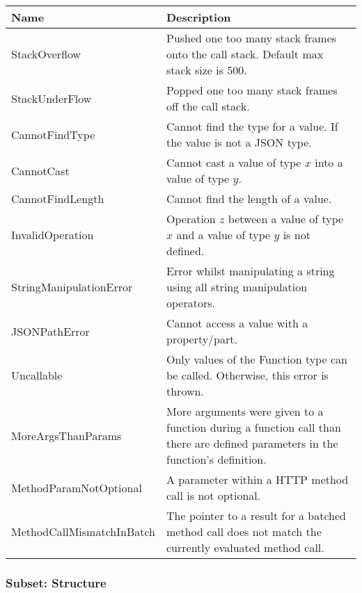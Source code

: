 \begin{center}
    \small
    \begin{tabular}{| m{5cm} | m{5cm} |}
        \hline
        Name & Description\\
        \hline
        StackOverflow & Pushed one too many stack frames onto the call stack. Default max stack size is 500.\\
        \hline
	    StackUnderFlow & Popped one too many stack frames off the call stack.\\
        \hline
	    CannotFindType & Cannot find the type for a value. If the value is not a JSON type.\\
        \hline
	    CannotCast & Cannot cast a value of type $x$ into a value of type $y$.\\
        \hline
	    CannotFindLength & Cannot find the length of a value.\\
        \hline
	    InvalidOperation & Operation $z$ between a value of type $x$ and a value of type $y$ is not defined.\\
        \hline
	    StringManipulationError & Error whilst manipulating a string using all string manipulation operators.\\
        \hline
	    JSONPathError & Cannot access a value with a property/part.\\
        \hline
	    Uncallable & Only values of the Function type can be called. Otherwise, this error is thrown.\\
        \hline
	    MoreArgsThanParams & More arguments were given to a function during a function call than there are defined parameters in the function's definition.\\
        \hline
	    MethodParamNotOptional & A parameter within a HTTP method call is not optional.\\
        \hline
        MethodCallMismatchInBatch & The pointer to a result for a batched method call does not match the currently evaluated method call.\\
        \hline
    \end{tabular}
\end{center}
\normalsize

\subsubsection{Subset: Structure}

